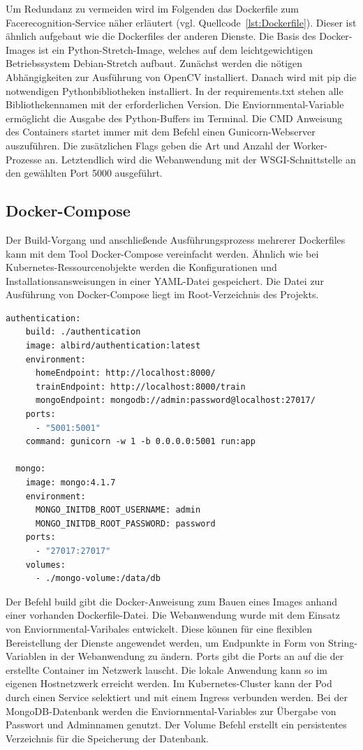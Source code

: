 Um Redundanz zu vermeiden wird im Folgenden das Dockerfile zum Facerecognition-Service näher erläutert (vgl. Quellcode~\ref{lst:Dockerfile}).
Dieser ist ähnlich aufgebaut wie die Dockerfiles der anderen Dienste.
Die Basis des Docker-Images ist ein Python-Stretch-Image, welches auf dem leichtgewichtigen Betriebssystem Debian-Stretch aufbaut.
Zunächst werden die nötigen Abhängigkeiten zur Ausführung von OpenCV installiert.
Danach wird mit pip die notwendigen Pythonbibliotheken installiert.
In der requirements.txt stehen alle Bibliothekennamen mit der erforderlichen Version.
Die Enviornmental-Variable ermöglicht die Ausgabe des Python-Buffers im Terminal.
Die CMD Anweisung des Containers startet immer mit dem Befehl einen Gunicorn-Webserver auszuführen.
Die zusätzlichen Flags geben die Art und Anzahl der Worker-Prozesse an.
Letztendlich wird die Webanwendung mit der WSGI-Schnittstelle an den gewählten Port 5000 ausgeführt.

\subsection{Docker-Compose}

Der Build-Vorgang und anschließende Ausführungsprozess mehrerer Dockerfiles kann mit dem Tool Docker-Compose vereinfacht werden.
Ähnlich wie bei Kubernetes-Ressourcenobjekte werden die Konfigurationen und Installationsansweisungen in einer YAML-Datei gespeichert.
Die Datei zur Ausführung von Docker-Compose liegt im Root-Verzeichnis des Projekts.

\begin{lstlisting}[caption={Ausschnit aus dem docker-compose.yaml},captionpos=b ,label={lst:docker-compose.yaml},language=Dockerfile]
  authentication:
    build: ./authentication
    image: albird/authentication:latest
    environment:
      homeEndpoint: http://localhost:8000/
      trainEndpoint: http://localhost:8000/train 
      mongoEndpoint: mongodb://admin:password@localhost:27017/
    ports:
      - "5001:5001"
    command: gunicorn -w 1 -b 0.0.0.0:5001 run:app

  mongo:
    image: mongo:4.1.7
    environment:
      MONGO_INITDB_ROOT_USERNAME: admin
      MONGO_INITDB_ROOT_PASSWORD: password
    ports:
      - "27017:27017"
    volumes:
      - ./mongo-volume:/data/db
  \end{lstlisting}

Der Befehl build gibt die Docker-Anweisung zum Bauen eines Images anhand einer vorhanden Dockerfile-Datei.
Die Webanwendung wurde mit dem Einsatz von Enviornmental-Varibales entwickelt.
Diese können für eine flexiblen Bereistellung der Dienste angewendet werden, um Endpunkte in Form von String-Variablen in der Webanwendung zu ändern.
Ports gibt die Ports an auf die der erstellte Container im Netzwerk lauscht.
Die lokale Anwendung kann so im eigenen Hostnetzwerk erreicht werden.
Im Kubernetes-Cluster kann der Pod durch einen Service selektiert und mit einem Ingress verbunden werden.
Bei der MongoDB-Datenbank werden die Enviornmental-Variables zur Übergabe von Passwort und Adminnamen genutzt.
Der Volume Befehl erstellt ein persistentes Verzeichnis für die Speicherung der Datenbank.


